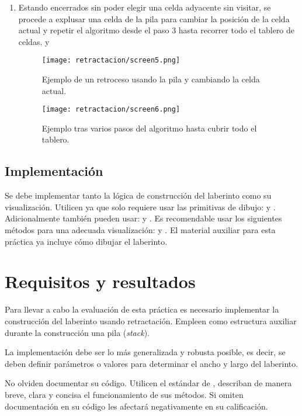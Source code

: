\begin{enumerate}
  \item Estando encerrados sin poder elegir una celda adyacente sin visitar, se procede a explusar una celda de la pila para cambiar la posición de la celda actual y repetir el algoritmo desde el paso 3 hasta recorrer todo el tablero de celdas. y 
    \begin{figure}[h!]
      \centering
      \texttt{[image: retractacion/screen5.png]}
      \caption{Ejemplo de un retroceso usando la pila y cambiando la celda actual.}
      \label{fig:tablero5}
    \end{figure}
    \pagebreak
    \begin{figure}[h!]
      \centering
      \texttt{[image: retractacion/screen6.png]}
      \caption{Ejemplo tras varios pasos del algoritmo hasta cubrir todo el tablero.}
      \label{fig:tablero6}
    \end{figure}
\end{enumerate}


\subsection{Implementaci\'on}

Se debe implementar tanto la lógica de construcción del laberinto como su visualización. Utilicen  ya que solo requiere usar las primitivas de dibujo:  y . Adicionalmente también pueden usar:  y . Es recomendable usar los siguientes métodos para una adecuada visualización:  y .  El material auxiliar para esta práctica ya incluye cómo dibujar el laberinto.



\section{Requisitos y resultados}

Para llevar a cabo la evaluación de esta práctica es necesario implementar la construcción del laberinto usando retractación. Empleen como estructura auxiliar durante la construcción una pila (\textit{stack}).

La implementación debe ser lo más generalizada y robusta posible, es decir, se deben definir parámetros o valores para determinar el ancho y largo del laberinto.

No olviden documentar su código. Utilicen el estándar de , describan de manera breve, clara y concisa el funcionamiento de sus métodos. Si omiten documentación en su código les afectará negativamente en su calificación.

